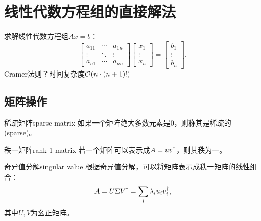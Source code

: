 \chapter{线性代数方程组的直接解法}

求解线性代数方程组$Ax=b$：
\begin{equation}
    \begin{bmatrix}
        a_{11}&\cdots&a_{1n}\\
        \vdots&\ddots&\vdots\\
        a_{n1}&\cdots&a_{nn}
    \end{bmatrix}\begin{bmatrix}
        x_1\\\vdots\\x_n
    \end{bmatrix}=\begin{bmatrix}
        b_1\\\vdots\\b_n
    \end{bmatrix}.
\end{equation}
Cramer法则？时间复杂度$\mathcal O(n\cdot(n+1)!)$

\section{矩阵操作}

\begin{definition}
    {稀疏矩阵}{sparse matrix}
    如果一个矩阵绝大多数元素是0，则称其是稀疏的(sparse)。
\end{definition}

\begin{definition}
    {秩一矩阵}{rank-1 matrix}
    若一个矩阵可以表示成$A=uv^\dagger$，则其秩为一。
\end{definition}

\begin{theorem}
    {奇异值分解}{singular value}
    根据奇异值分解，可以将矩阵表示成秩一矩阵的线性组合：
    \begin{equation}
        A=U\Sigma V^\dagger=\sum_i\lambda_iu_iv_i^\dagger,
    \end{equation}
    其中$U,V$为幺正矩阵。
\end{theorem}


